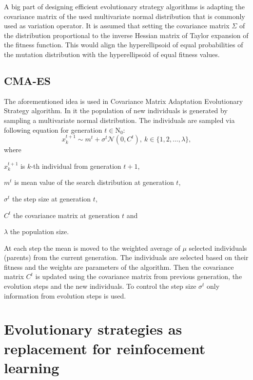 A big part of designing efficient evolutionary strategy algorithms is adapting the covariance matrix of the used multivariate normal distribution that is commonly used as variation operator. It is assumed that setting the covariance matrix $\Sigma$ of the distribution proportional to the inverse Hessian matrix of Taylor expansion of the fitness function. This would align the hyperellipsoid of equal probabilities of the mutation distribution with the hyperellipsoid of equal fitness values.\cite{Schwefel1995}\cite{Rudolph2012}

\subsection{CMA-ES}
\label{subsec:cma-es}
The aforementioned idea is used in Covariance Matrix Adaptation Evolutionary Strategy algorithm. In it the population of new individuals is generated by sampling a multivariate normal distribution. The individuals are sampled via following equation for generation $t \in \mathrm{N}_0$:
\begin{equation}
    x_k^{t+1} \sim m^t + \sigma^t\mathcal{N}(0,C^t),\ k\in \{1,2,\dots,\lambda\}, 
\end{equation}
where 
\begin{description}
    \item $x_k^{t+1}$ is $k$-th individual from generation $t+1$, 
    \item $m^t$ is mean value of the search distribution at generation $t$,
    \item $\sigma^t$ the step size at generation $t$,
    \item $C^t$ the covariance matrix at generation $t$ and
    \item $\lambda$ the population size.
\end{description}

At each step the mean is moved to the weighted average of $\mu$ selected individuals (parents) from the current generation. The individuals are selected based on their fitness and the weights are parameters of the algorithm. Then the covariance matrix $C^t$ is updated using the covariance matrix from previous generation, the evolution steps and the new individuals. To control the step size $\sigma^t$ only information from evolution steps is used.\cite{hansen2016cma}

\section{Evolutionary strategies as replacement for reinfocement learning}
\label{sec:es-reinf}

